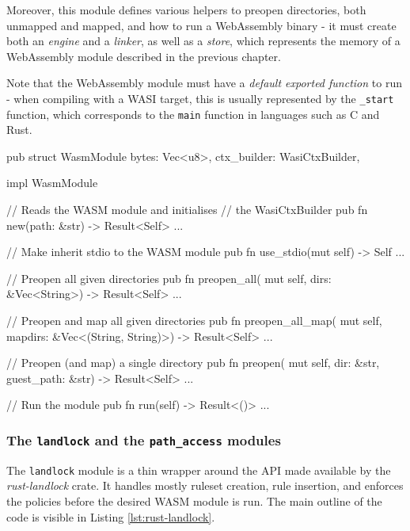 Moreover, this module defines various helpers to preopen directories, both unmapped and mapped, and
how to run a WebAssembly binary - it must create both an \textit{engine} and a \textit{linker},
as well as a \textit{store}, which represents the memory of a WebAssembly module described in the previous chapter.

Note that the WebAssembly module must have a \textit{default exported function} to run - when compiling with a WASI target,
this is usually represented by the \texttt{\_start} function, which corresponds to the \texttt{main} function in languages
such as C and Rust.

\begin{code}[language=Rust, caption=The outline of the \texttt{wasm} module., label=lst:wasm-module-outline]
  pub struct WasmModule {
    bytes: Vec<u8>, ctx_builder: WasiCtxBuilder,
  }
  
  impl WasmModule {
    // Reads the WASM module and initialises
    // the WasiCtxBuilder
    pub fn new(path: &str) -> Result<Self> {...}
  
    // Make inherit stdio to the WASM module
    pub fn use_stdio(mut self) -> Self {...}
  
    // Preopen all given directories
    pub fn preopen_all(
      mut self,
      dirs: &Vec<String>) -> Result<Self> {...}
  
    // Preopen and map all given directories
    pub fn preopen_all_map(
      mut self,
      mapdirs: &Vec<(String, String)>)
      -> Result<Self> {...}
  
    // Preopen (and map) a single directory
    pub fn preopen(
      mut self,
      dir: &str, guest_path: &str) -> Result<Self> {...}
  
    // Run the module
    pub fn run(self) -> Result<()> {...}
  }  
  \end{code}

\subsubsection{The \texttt{landlock} and the \texttt{path\_access} modules}

The \texttt{landlock} module is a thin wrapper around the API made available by the \textit{rust-landlock} crate.
It handles mostly ruleset creation, rule insertion, and enforces the policies before the desired WASM module is run.
The main outline of the code is visible in Listing \ref{lst:rust-landlock}.


